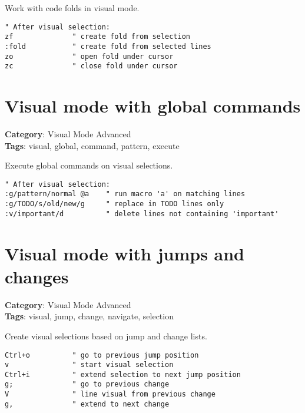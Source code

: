 {{{{{{{{{{{{{{{{{{Work with code folds in visual mode.

\begin{Exa*}{}
\begin{Verbatim}[fontsize=\footnotesize, breaklines, breakanywhere]
" After visual selection:
zf              " create fold from selection
:fold           " create fold from selected lines
zo              " open fold under cursor
zc              " close fold under cursor
\end{Verbatim}
\end{Exa*}

\section{Visual mode with global commands}

\textbf{Category}: Visual Mode Advanced\\ \textbf{Tags}: visual, global, command, pattern, execute
\vspace{0.5cm}

Execute global commands on visual selections.

\begin{Exa*}{}
\begin{Verbatim}[fontsize=\footnotesize, breaklines, breakanywhere]
" After visual selection:
:g/pattern/normal @a    " run macro 'a' on matching lines
:g/TODO/s/old/new/g     " replace in TODO lines only
:v/important/d          " delete lines not containing 'important'
\end{Verbatim}
\end{Exa*}

\section{Visual mode with jumps and changes}

\textbf{Category}: Visual Mode Advanced\\ \textbf{Tags}: visual, jump, change, navigate, selection
\vspace{0.5cm}

Create visual selections based on jump and change lists.

\begin{Exa*}{}
\begin{Verbatim}[fontsize=\footnotesize, breaklines, breakanywhere]
Ctrl+o          " go to previous jump position
v               " start visual selection  
Ctrl+i          " extend selection to next jump position
g;              " go to previous change
V               " line visual from previous change  
g,              " extend to next change
\end{Verbatim}
\end{Exa*}

}}}}}}}}}}}}}}}}}}
